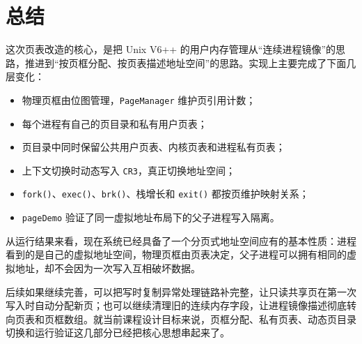 \chapter{总结}\label{chap:conclusion}

这次页表改造的核心，是把 Unix V6++ 的用户内存管理从“连续进程镜像”的思路，推进到“按页框分配、按页表描述地址空间”的思路。实现上主要完成了下面几层变化：

\begin{itemize}
  \item 物理页框由位图管理，\texttt{PageManager} 维护页引用计数；
  \item 每个进程有自己的页目录和私有用户页表；
  \item 页目录中同时保留公共用户页表、内核页表和进程私有页表；
  \item 上下文切换时动态写入 \texttt{CR3}，真正切换地址空间；
  \item \texttt{fork()}、\texttt{exec()}、\texttt{brk()}、栈增长和 \texttt{exit()} 都按页维护映射关系；
  \item \texttt{pageDemo} 验证了同一虚拟地址布局下的父子进程写入隔离。
\end{itemize}

从运行结果来看，现在系统已经具备了一个分页式地址空间应有的基本性质：进程看到的是自己的虚拟地址空间，物理页框由页表决定，父子进程可以拥有相同的虚拟地址，却不会因为一次写入互相破坏数据。

后续如果继续完善，可以把写时复制异常处理链路补完整，让只读共享页在第一次写入时自动分配新页；也可以继续清理旧的连续内存字段，让进程镜像描述彻底转向页表和页框数组。就当前课程设计目标来说，页框分配、私有页表、动态页目录切换和运行验证这几部分已经把核心思想串起来了。
